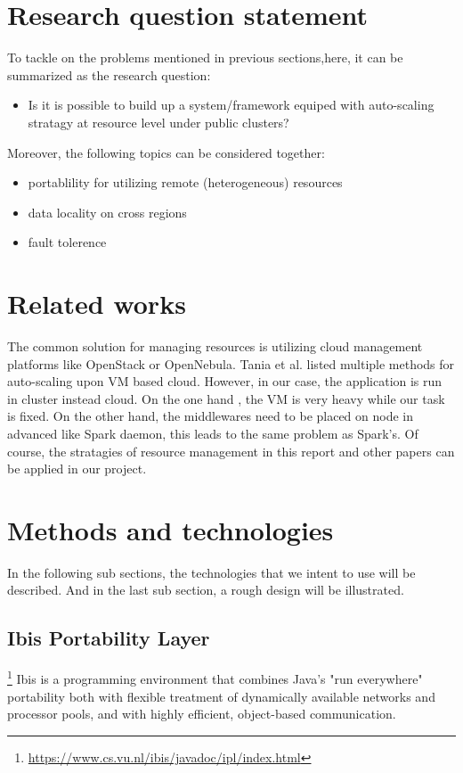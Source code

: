 \documentclass[sigchi]{acmart}
\begin{document}
\section{Research question statement}
To tackle on the problems mentioned in previous sections,here, it can be summarized as the research question:
\begin{itemize}
    \item Is it is possible to build up a system/framework equiped with auto-scaling stratagy at resource level under public clusters?
\end{itemize}

Moreover, the following topics can be considered together:
\begin{itemize}
  \item portablility for utilizing remote (heterogeneous) resources
  \item data locality on cross regions 
  \item fault tolerence 
\end{itemize}

\section{Related works}
The common solution for managing resources is utilizing cloud management platforms like OpenStack or OpenNebula. 
Tania et al. \cite{Lorido-Botran2014} listed multiple methods for auto-scaling upon VM based cloud. However, in our case, the application is run in cluster instead cloud.
On the one hand , the VM is very heavy while our task is fixed. On the other hand, the middlewares need to be placed on node in advanced like Spark daemon, this leads to the same problem as Spark's.
Of course, the stratagies of resource management in this report and other papers\cite{Kang2013}\cite{Mao2011} can be applied in our project. 

\section{Methods and technologies}
In the following sub sections, the technologies that we intent to use  will be described. And in the last sub section, a rough design will be illustrated. 

\subsection{ Ibis Portability Layer }\footnote{\url{https://www.cs.vu.nl/ibis/javadoc/ipl/index.html}}
Ibis\cite{van2002ibis} is a programming environment that combines Java's "run everywhere" portability both with flexible treatment of dynamically available networks and processor pools, and with highly efficient, object-based communication.





\end{document}

